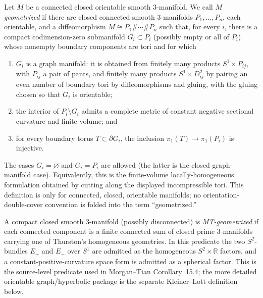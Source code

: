 \begin{definition}
\label{def:thurston-geometrized}
\notready
Let $M$ be a connected closed orientable smooth $3$-manifold.  We call $M$
\emph{geometrized} if there are closed connected smooth $3$-manifolds
$P_1,\ldots,P_n$, each orientable, and a diffeomorphism
$M\cong P_1\#\cdots\#P_n$ such that, for every $i$, there is a compact
codimension-zero submanifold $G_i\subset P_i$ (possibly empty or all of
$P_i$) whose nonempty boundary components are tori and for which
\begin{enumerate}
\item $G_i$ is a graph manifold: it is obtained from finitely many products
      $S^1\times P_{ij}$, with $P_{ij}$ a pair of pants, and finitely many
      products $S^1\times D^2_{ij}$ by pairing an even number of boundary
      tori by diffeomorphisms and gluing, with the gluing chosen so that
      $G_i$ is orientable;
\item the interior of $P_i\setminus G_i$ admits a complete metric of
      constant negative sectional curvature and finite volume; and
\item for every boundary torus $T\subset\partial G_i$, the inclusion
      $\pi_1(T)\to\pi_1(P_i)$ is injective.
\end{enumerate}
The cases $G_i=\varnothing$ and $G_i=P_i$ are allowed (the latter is the
closed graph-manifold case).  Equivalently, this is the finite-volume
locally-homogeneous formulation obtained by cutting along the displayed
incompressible tori.  This definition is only for connected, closed,
orientable manifolds; no orientation-double-cover convention is folded into
the term ``geometrized.''
\end{definition}

\begin{definition}
\label{def:morgan-tian-geometrized}
\notready
A compact closed smooth $3$-manifold (possibly disconnected) is
\emph{MT-geometrized} if each connected component is a finite connected sum
of closed prime $3$-manifolds carrying one of Thurston's homogeneous
geometries.  In this predicate the two $S^2$-bundles $E_+$ and $E_-$ over
$S^1$ are admitted as the homogeneous $S^2\times\mathbb R$ factors, and a
constant-positive-curvature space form is admitted as a spherical factor.
This is the source-level predicate used in Morgan--Tian Corollary~15.4; the
more detailed orientable graph/hyperbolic package is the separate
Kleiner--Lott definition below.
\end{definition}

